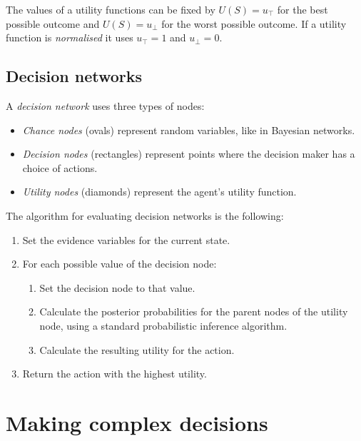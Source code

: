 \documentclass{article}
\begin{document}
\begin{definition}[R\&N p. 615]
	The values of a utility functions can be fixed by $U(S)=u_\top$ for the
	best possible outcome and $U(S)=u_\bot$ for the worst possible outcome.
	If a utility function is \emph{normalised} it uses $u_\top = 1$ and
	$u_\bot = 0$.
\end{definition}

\subsection{Decision networks}

\begin{definition}[R\&N p. 626]
	A \emph{decision network} uses three types of nodes:
	\begin{itemize}
		\item \emph{Chance nodes} (ovals) represent random variables, like in Bayesian networks.
		\item \emph{Decision nodes} (rectangles) represent points where the decision maker
		      has a choice of actions.
		\item \emph{Utility nodes} (diamonds) represent the agent's utility function.
	\end{itemize}
\end{definition}

\begin{theorem}[R\&N p. 628]
	The algorithm for evaluating decision networks is the following:
	\begin{enumerate}
		\item Set the evidence variables for the current state.
		\item For each possible value of the decision node: \begin{enumerate}
			      \item Set the decision node to that value.
			      \item Calculate the posterior probabilities for the parent nodes of
			            the utility node, using a standard probabilistic inference algorithm.
			      \item Calculate the resulting utility for the action.
		      \end{enumerate}
		\item Return the action with the highest utility.
	\end{enumerate}
\end{theorem}


\section{Making complex decisions}
\end{document}
